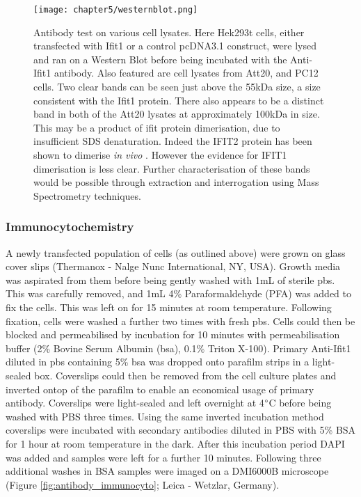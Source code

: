 \begin{figure*}[!htbp]
\centering
\texttt{[image: chapter5/westernblot.png]}
\caption[Antibody test on various cell lysates]{Antibody test on various cell lysates. Here Hek293t cells, either transfected with Ifit1 or a control pcDNA3.1 construct, were lysed and ran on a Western Blot before being incubated with the Anti-Ifit1 antibody. Also featured are cell lysates from Att20, and PC12 cells. Two clear bands can be seen just above the 55kDa size, a size consistent with the Ifit1 protein. There also appears to be a distinct band in both of the Att20 lysates at approximately 100kDa in size. This may be a product of ifit protein dimerisation, due to insufficient SDS denaturation. Indeed the IFIT2 protein has been shown to dimerise \textit{in vivo} \cite{Yang2012}. However the evidence for IFIT1 dimerisation is less clear. Further characterisation of these bands would be possible through extraction and interrogation using Mass Spectrometry techniques.}
\label{fig:antibody_validation}
\end{figure*}

\subsubsection{Immunocytochemistry}

A newly transfected population of cells (as outlined above) were grown on glass cover slips (Thermanox - Nalge Nunc International, NY, USA). Growth media was aspirated from them before being gently washed with 1mL of sterile \acrshort{pbs}. This was carefully removed, and 1mL 4\% Paraformaldehyde (PFA) was added to fix the cells. This was left on for 15 minutes at room temperature. Following fixation, cells were washed a further two times with fresh \acrshort{pbs}. Cells could then be blocked and permeabilised by incubation for 10 minutes with permeabilisation buffer (2\% Bovine Serum Albumin (\acrshort{bsa}), 0.1\% Triton X-100). Primary Anti-Ifit1 diluted in \acrshort{pbs} containing 5\% \acrshort{bsa} was dropped onto parafilm strips in a light-sealed box. Coverslips could then be removed from the cell culture plates and inverted ontop of the parafilm to enable an economical usage of primary antibody. Coverslips were light-sealed and left overnight at 4$\degree$C before being washed with PBS three times. Using the same inverted incubation method coverslips were incubated with secondary antibodies diluted in PBS with 5\% BSA for 1 hour at room temperature in the dark. After this incubation period DAPI was added and samples were left for a further 10 minutes. Following three additional washes in BSA samples were imaged on a DMI6000B microscope (Figure \ref{fig:antibody_immunocyto}; Leica - Wetzlar, Germany). \\

